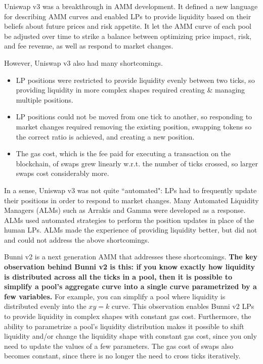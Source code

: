 \documentclass[twocolumn]{article}
\begin{document}
Uniswap v3 was a breakthrough in AMM development. It defined a new language for describing AMM curves and enabled LPs to provide liquidity based on their beliefs about future prices and risk appetite. It let the AMM curve of each pool be adjusted over time to strike a balance between optimizing price impact, risk, and fee revenue, as well as respond to market changes.

However, Uniswap v3 also had many shortcomings.

\begin{itemize}
  \item LP positions were restricted to provide liquidity evenly between two ticks, so providing liquidity in more complex shapes required creating \& managing multiple positions.
  \item LP positions could not be moved from one tick to another, so responding to market changes required removing the existing position, swapping tokens so the correct ratio is achieved, and creating a new position. 
  \item The gas cost, which is the fee paid for executing a transaction on the blockchain, of swaps grew linearly w.r.t. the number of ticks crossed, so larger swaps cost considerably more.
\end{itemize}

In a sense, Uniswap v3 was not quite ``automated": LPs had to frequently update their positions in order to respond to market changes. Many Automated Liquidity Managers (ALMs) such as Arrakis and Gamma were developed as a response. ALMs used automated strategies to perform the position updates in place of the human LPs. ALMs made the experience of providing liquidity better, but did not and could not address the above shortcomings.

Bunni v2 is a next generation AMM that addresses these shortcomings. \textbf{The key observation behind Bunni v2 is this: if you know exactly how liquidity is distributed across all the ticks in a pool, then it is possible to simplify a pool's aggregate curve into a single curve parametrized by a few variables.} For example, you can simplify a pool where liquidity is distributed evenly into the $xy=k$ curve. This observation enables Bunni v2 LPs to provide liquidity in complex shapes with constant gas cost. Furthermore, the ability to parametrize a pool's liquidity distribution makes it possible to shift liquidity and/or change the liquidity shape with constant gas cost, since you only need to update the values of a few parameters. The gas cost of swaps also becomes constant, since there is no longer the need to cross ticks iteratively. 
\end{document}
